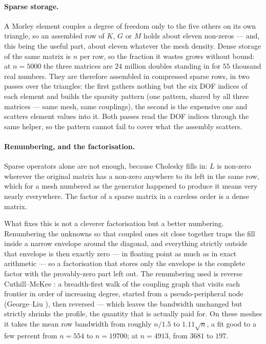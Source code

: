 \documentclass[11pt,a4paper]{article}
\begin{document}
\paragraph{Sparse storage.}
A Morley element couples a degree of freedom only to the five others on
its own triangle, so an assembled row of $K$, $G$ or $M$ holds about
eleven non-zeros --- and, this being the useful part, about eleven
whatever the mesh density. Dense storage of the same matrix is $n$ per
row, so the fraction it wastes grows without bound: at $n = 5000$ the
three matrices are $24$ million doubles standing in for $55$ thousand real
numbers. They are therefore assembled in compressed sparse rows, in two
passes over the triangles: the first gathers nothing but the six DOF
indices of each element and builds the sparsity pattern (one pattern,
shared by all three matrices --- same mesh, same couplings), the second is
the expensive one and scatters element values into it. Both passes read
the DOF indices through the same helper, so the pattern cannot fail to
cover what the assembly scatters.

\paragraph{Renumbering, and the factorisation.}
Sparse operators alone are not enough, because Cholesky fills in: $L$ is
non-zero wherever the original matrix has a non-zero anywhere to its left
in the same row, which for a mesh numbered as the generator happened to
produce it means very nearly everywhere. The factor of a sparse matrix in
a careless order is a dense matrix.

What fixes this is not a cleverer factorisation but a better numbering.
Renumbering the unknowns so that coupled ones sit close together traps the
fill inside a narrow envelope around the diagonal, and everything strictly
outside that envelope is then exactly zero --- in floating point as much as
in exact arithmetic --- so a factorisation that stores only the envelope is
the complete factor with the provably-zero part left out. The renumbering
used is reverse Cuthill--McKee \cite{cuthill-mckee}: a breadth-first walk
of the coupling graph that visits each frontier in order of increasing
degree, started from a pseudo-peripheral node (George--Liu
\cite{george-liu}), then reversed --- which leaves the bandwidth unchanged
but strictly shrinks the profile, the quantity that is actually paid for.
On these meshes it takes the mean row bandwidth from roughly $n/1.5$ to
$1.11\sqrt{n}$, a fit good to a few percent from $n = 554$ to
$n = 19700$; at $n = 4913$, from $3681$ to $197$.
\end{document}
